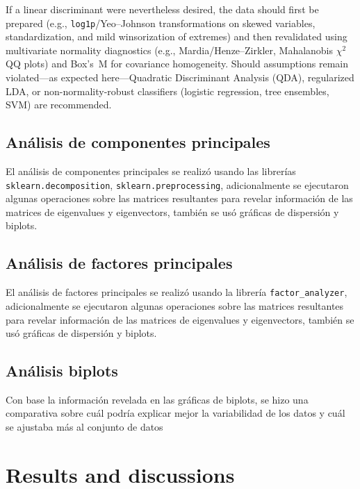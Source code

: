 \documentclass[journal]{IEEEtran}
\begin{document}
	If a linear discriminant were nevertheless desired, the data should first be prepared (e.g., \texttt{log1p}/Yeo--Johnson
	transformations on skewed variables, standardization, and mild winsorization of extremes) and then revalidated using
	multivariate normality diagnostics (e.g., Mardia/Henze--Zirkler, Mahalanobis $\chi^2$ QQ plots) and Box’s~M for covariance
	homogeneity. Should assumptions remain violated—as expected here—Quadratic Discriminant Analysis (QDA), regularized LDA,
	or non-normality-robust classifiers (logistic regression, tree ensembles, SVM) are recommended.


	\subsection{Análisis de componentes principales}
	\label{ssec:pca}
	El análisis de componentes principales se realizó usando las librerías \texttt{sklearn.decomposition}, \texttt{sklearn.preprocessing}, adicionalmente se ejecutaron algunas operaciones sobre las matrices resultantes para revelar información de las matrices de eigenvalues y eigenvectors, también se usó gráficas de dispersión y biplots.

	\subsection{Análisis de factores principales}
	El análisis de factores principales se realizó usando la librería \texttt{factor\_analyzer}, adicionalmente se ejecutaron algunas operaciones sobre las matrices resultantes para revelar información de las matrices de eigenvalues y eigenvectors, también se usó gráficas de dispersión y biplots.


	\subsection{Análisis biplots}
	Con base la información revelada en las gráficas de biplots, se hizo una comparativa sobre cuál podría explicar mejor la variabilidad de los datos y cuál se ajustaba más al conjunto de datos

	\section{Results and discussions}
\end{document}
